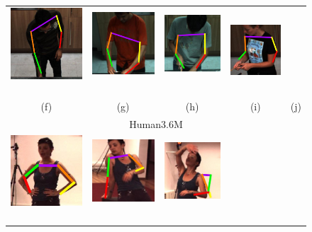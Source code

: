 \documentclass[runningheads]{llncs}
\begin{document}
\begin{figure}[t]
\begin{center}
\begin{tabular}{@{}c@{}c c@{}c@{}c@{}}
\includegraphics[width=0.19\linewidth]{figures/shots-cropped/mpii-s8f38-good-open-draw.jpg}\,&
\includegraphics[width=0.19\linewidth]{figures/shots-cropped/mpii-s2f10-bad-shoulders.jpg}\,&
\includegraphics[width=0.19\linewidth]{figures/shots-cropped/mpii-s5f52-bad-shoulders.jpg}\,&
\includegraphics[width=0.19\linewidth]{figures/shots-cropped/mpii-s14f21-bad-forearm.jpg}\\
(f) & (g) & (h) & (i) & (j)\\[0.6em]
\multicolumn{5}{c}{Human3.6M}\\
\includegraphics[width=0.19\linewidth]{figures/shots-cropped/h36m-s28f2-good-teapot.jpg}\,&
\includegraphics[width=0.19\linewidth]{figures/shots-cropped/h36m-s31f12-good-chair.jpg}\,&
\includegraphics[width=0.19\linewidth]{figures/shots-cropped/h36m-s7f8-bad-extreme-articulation.jpg}\,&

\end{tabular}
\end{center}
\end{figure}
\end{document}
